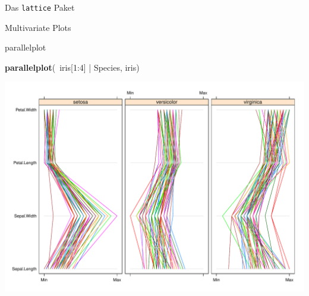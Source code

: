 \documentclass[ignorenonframetext,]{beamer}
\newenvironment{Shaded}{}{}
\newcommand{\KeywordTok}[1]{\textcolor[rgb]{0.00,0.44,0.13}{\textbf{{#1}}}}
\newcommand{\DecValTok}[1]{\textcolor[rgb]{0.25,0.63,0.44}{{#1}}}
\newcommand{\StringTok}[1]{\textcolor[rgb]{0.25,0.44,0.63}{{#1}}}
\newcommand{\NormalTok}[1]{{#1}}
\begin{document}
\begin{frame}[fragile]{Das \texttt{lattice} Paket}
\begin{block}{Multivariate Plots}
\end{block}

\begin{block}{parallelplot}

\begin{Shaded}
\begin{Highlighting}[]
\KeywordTok{parallelplot}\NormalTok{(~iris[}\DecValTok{1}\NormalTok{:}\DecValTok{4}\NormalTok{] |}\StringTok{ }\NormalTok{Species, iris)}
\end{Highlighting}
\end{Shaded}

\includegraphics{R_intern_files/figure-beamer/unnamed-chunk-231-1.pdf}

\end{block}

\end{frame}
\end{document}
